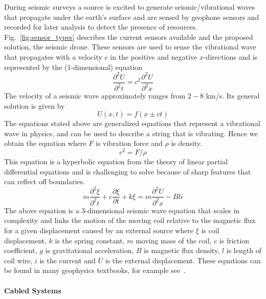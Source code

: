 During seismic surveys a source is excited to generate seismic/vibrational waves that propagate under the earth's surface and are sensed by geophone sensors and recorded for later analysis to detect the presence of resources. Fig.~\ref{fig:sensor_types} describes the current sensors available and the proposed solution, the seismic drone. These sensors are used to sense the vibrational wave that propagates with a velocity $c$ in the positive and negative $x$-directions and is represented by the (1-dimensional) equation
\begin{equation}
\frac{\partial^{2}{U}}{\partial^{2}{t}} = {c}^{2}\frac{\partial^{2}{U}}{\partial^{2}{x}}
\end{equation}
The velocity of a seismic wave approximately ranges from $2-8$ km/s.
Its general solution is given by
\begin{equation}
U(x,t) = f(x \pm ct)
\end{equation}
The equations stated above are generalized equations that represent a vibrational wave in physics, and can be used to describe a string that is vibrating. Hence we obtain the equation where $F$ is vibration force and $\rho$ is density.
\begin{equation}
{c}^{2} = F/\rho
\end{equation}
This equation is a hyperbolic equation from the theory of linear partial differential equations and is challenging to solve because of sharp features that can reflect off boundaries.
\begin{equation}
m\frac{\partial^{2}{\xi}}{\partial^{2}{t}}+c\frac{\partial{\xi}}{\partial{t}}+k\xi = m\frac{\partial^{2}{U}}{\partial^{2}{x}}-Bli
\end{equation} 
The above equation is a $3$-dimensional seismic wave equation that scales in complexity and links the motion of the moving coil relative to the magnetic flux for a given displacement caused by an external source where $\xi$ is coil displacement, $k$ is the spring constant, $m$ moving mass of the coil, $c$ is friction coefficient, $g$ is gravitational acceleration, $B$ is magnetic flux density, $l$ is length of coil wire, $i$ is the current and $U$ is the external displacement. These equations can be found in many geophysics textbooks, for example see~\cite{shearer2009introduction}.

 \paragraph{Cabled Systems}

